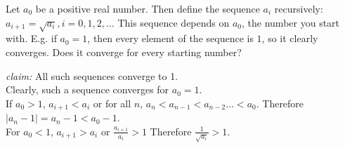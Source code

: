 \documentclass[boxes, qed]{homework}
\begin{document}
\newenvironment{amatrix}[1]{%
  \left[\begin{array}{@{}*{#1}{c}|c@{}}
}{%
  \end{array}\right]
}

\newenvironment{augmatrix}[1]{%
  \left[\begin{array}{#1}
}{%
  \end{array}\right]
}

\begin{problem}Let $a_0$ be a positive real number. 
  Then define the sequence $a_i$ recursively:  
  $a_{i+1}=\sqrt{a_i},i=0,1,2,\dots$ 
  This sequence depends on $a_0$, the number you start with.
  E.g. if $a_0=1$, then every element of the sequence is $1$, 
  so it clearly converges. Does it converge for every starting number? 
\end{problem}
\begin{solution}
  \textit{claim:} All such sequences converge to 1.\\
  Clearly, such a sequence converges for $a_0=1$.\\
  If $a_0>1$, $a_{i+1}<a_i$ or for all $n$, $a_n<a_{n-1}<a_{n-2}\dots<a_0$.
  Therefore $|a_n-1| = a_n-1 < a_0-1$.\\
  For $a_0<1$, $a_{i+1}>a_i$ or $\frac{a_{i+1}}{a_i}>1$
  Therefore $\frac{1}{\sqrt{a_i}}>1$.\\
\end{solution}
\end{document}
